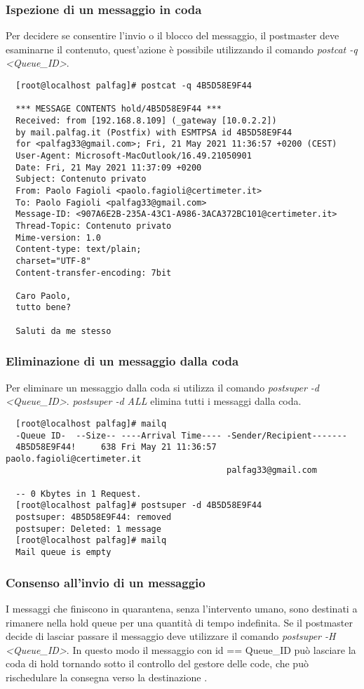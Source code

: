   \newpage
  \subsubsection{Ispezione di un messaggio in coda}
  Per decidere se consentire l'invio o il blocco del messaggio, il postmaster deve esaminarne il contenuto, 
  quest'azione è possibile utilizzando il comando \textit{postcat -q <Queue\_ID>}.

  \begin{verbatim}
  [root@localhost palfag]# postcat -q 4B5D58E9F44 

  *** MESSAGE CONTENTS hold/4B5D58E9F44 ***
  Received: from [192.168.8.109] (_gateway [10.0.2.2])
  by mail.palfag.it (Postfix) with ESMTPSA id 4B5D58E9F44
  for <palfag33@gmail.com>; Fri, 21 May 2021 11:36:57 +0200 (CEST)
  User-Agent: Microsoft-MacOutlook/16.49.21050901
  Date: Fri, 21 May 2021 11:37:09 +0200
  Subject: Contenuto privato
  From: Paolo Fagioli <paolo.fagioli@certimeter.it>
  To: Paolo Fagioli <palfag33@gmail.com>
  Message-ID: <907A6E2B-235A-43C1-A986-3ACA372BC101@certimeter.it>
  Thread-Topic: Contenuto privato
  Mime-version: 1.0
  Content-type: text/plain;
  charset="UTF-8"
  Content-transfer-encoding: 7bit

  Caro Paolo,
  tutto bene?

  Saluti da me stesso
  \end{verbatim}
  
  
  \subsubsection{Eliminazione di un messaggio dalla coda}
  Per eliminare un messaggio dalla coda si utilizza il comando \textit{postsuper -d <Queue\_ID>}.
  \textit{postsuper -d ALL} elimina tutti i messaggi dalla coda.

  \begin{verbatim}
  [root@localhost palfag]# mailq
  -Queue ID-  --Size-- ----Arrival Time---- -Sender/Recipient-------
  4B5D58E9F44!     638 Fri May 21 11:36:57  paolo.fagioli@certimeter.it
                                            palfag33@gmail.com
  
  -- 0 Kbytes in 1 Request.
  [root@localhost palfag]# postsuper -d 4B5D58E9F44 
  postsuper: 4B5D58E9F44: removed
  postsuper: Deleted: 1 message
  [root@localhost palfag]# mailq
  Mail queue is empty
  \end{verbatim}
  
  
  \subsubsection{Consenso all'invio di un messaggio}
  I messaggi che finiscono in quarantena, senza l'intervento umano, sono destinati a rimanere nella hold queue per una 
  quantità di tempo indefinita. Se il postmaster decide di lasciar passare il messaggio deve utilizzare il comando
  \textit{postsuper -H <Queue\_ID>}. In questo modo il messaggio con id == Queue\_ID può lasciare la coda di hold 
  tornando sotto il controllo del gestore delle code, 
  che può rischedulare la consegna verso la destinazione \cite{dent2003postfix}.

